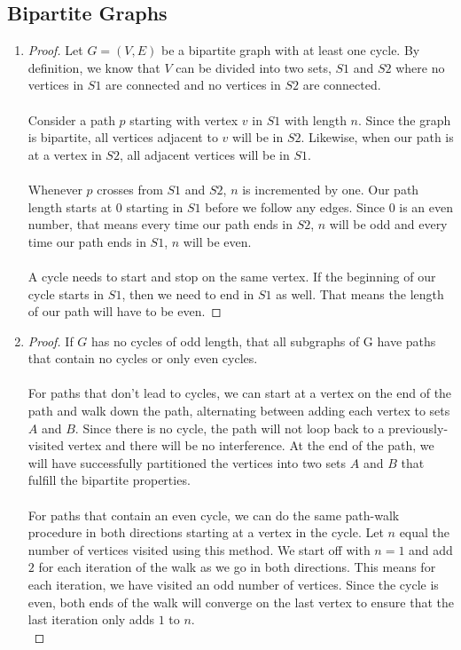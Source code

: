 \documentclass{article}
\begin{document}
\subsection{Bipartite Graphs}
\begin{enumerate}[label=(\alph*)]
    \item 
        \begin{proof}
            Let \(G = (V,E)\) be a bipartite graph with at least one cycle. By definition, we know that \(V\) can be divided into two sets, \(S1\) and \(S2\) where no vertices in \(S1\) are connected and no vertices in \(S2\) are connected. \\\\
            Consider a path \(p\) starting with vertex \(v\) in \(S1\) with length \(n\). Since the graph is bipartite, all vertices adjacent to \(v\) will be in \(S2\). Likewise, when our path is at a vertex in \(S2\), all adjacent vertices will be in \(S1\). \\\\
            Whenever \(p\) crosses from \(S1\) and \(S2\), \(n\) is incremented by one. Our path length starts at \(0\) starting in \(S1\) before we follow any edges. Since \(0\) is an even number, that means every time our path ends in \(S2\), \(n\) will be odd and every time our path ends in \(S1\), \(n\) will be even. \\\\
            A cycle needs to start and stop on the same vertex. If the beginning of our cycle starts in \(S1\), then we need to end in \(S1\) as well. That means the length of our path will have to be even.
        \end{proof}
        
    \item
        \begin{proof}
            If \(G\) has no cycles of odd length, that all subgraphs of G have paths that contain no cycles or only even cycles. \\\\
            For paths that don't lead to cycles, we can start at a vertex on the end of the path and walk down the path, alternating between adding each vertex to sets \(A\) and \(B\). Since there is no cycle, the path will not loop back to a previously-visited vertex and there will be no interference. At the end of the path, we will have successfully partitioned the vertices into two sets \(A\) and \(B\) that fulfill the bipartite properties. \\\\
            For paths that contain an even cycle, we can do the same path-walk procedure in both directions starting at a vertex in the cycle. Let \(n\) equal the number of vertices visited using this method. We start off with \(n=1\) and add \(2\) for each iteration of the walk as we go in both directions. This means for each iteration, we have visited an odd number of vertices. Since the cycle is even, both ends of the walk will converge on the last vertex to ensure that the last iteration only adds \(1\) to \(n\). \\
            

\end{proof}
\end{enumerate}
\end{document}

